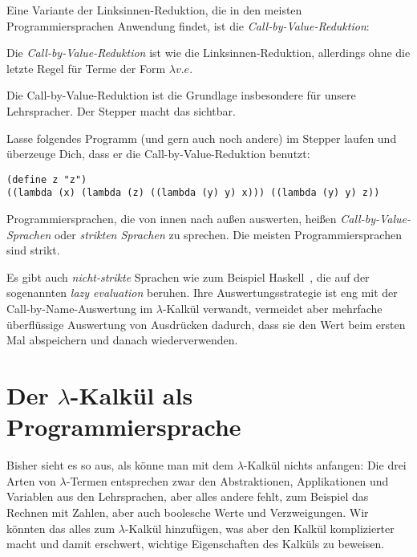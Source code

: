 \label{page:call-by-value}
Eine Variante der Linksinnen-Reduktion, die in den meisten
Programmiersprachen Anwendung findet, ist die
\textit{Call-by-Value-Reduktion}:
%
\begin{definition}\label{def:call-by-value}
    Die \textit{Call-by-Value-Reduktion} ist wie die
  Linksinnen-Reduktion, allerdings ohne die letzte Regel für Terme der
  Form $\lambda v.e$.
\end{definition}
%
Die Call-by-Value-Reduktion ist die Grundlage
insbesondere für unsere Lehrspracher.  Der Stepper macht das sichtbar.
%
\begin{aufgabeinline}
  Lasse folgendes Programm (und gern auch noch andere) im Stepper
  laufen und überzeuge Dich, dass er die Call-by-Value-Reduktion
  benutzt:
\begin{lstlisting}
(define z "z")
((lambda (x) (lambda (z) ((lambda (y) y) x))) ((lambda (y) y) z))
\end{lstlisting}
\end{aufgabeinline}
%
Programmiersprachen, die von innen nach außen auswerten, heißen
\textit{Call-by-Value-Sprachen} oder
\textit{strikten Sprachen} zu sprechen.
Die meisten Programmiersprachen sind strikt.

Es gibt auch \textit{nicht-strikte}
Sprachen wie zum Beispiel Haskell~\cite{Haskell2010},
die auf der sogenannten \textit{lazy evaluation} beruhen.  Ihre
Auswertungsstrategie ist eng mit der Call-by-Name-Auswertung im
$\lambda$-Kalkül verwandt, vermeidet
aber mehrfache überflüssige Auswertung von Ausdrücken dadurch, dass sie den
Wert beim ersten Mal abspeichern und danach wiederverwenden.

\section{Der $\lambda$-Kalkül als Programmiersprache}
\label{sec:lambdaprog}

Bisher sieht es so aus, als könne man mit dem
$\lambda$-Kalkül nichts anfangen: Die drei Arten von
$\lambda$-Termen entsprechen zwar den Abstraktionen, Applikationen und
Variablen aus den Lehrsprachen, aber alles andere fehlt,
zum Beispiel das Rechnen mit Zahlen, aber auch boolesche Werte und
Verzweigungen. Wir könnten das alles zum $\lambda$-Kalkül hinzufügen,
was aber den Kalkül komplizierter macht und damit erschwert,
wichtige Eigenschaften des Kalküls zu beweisen.

